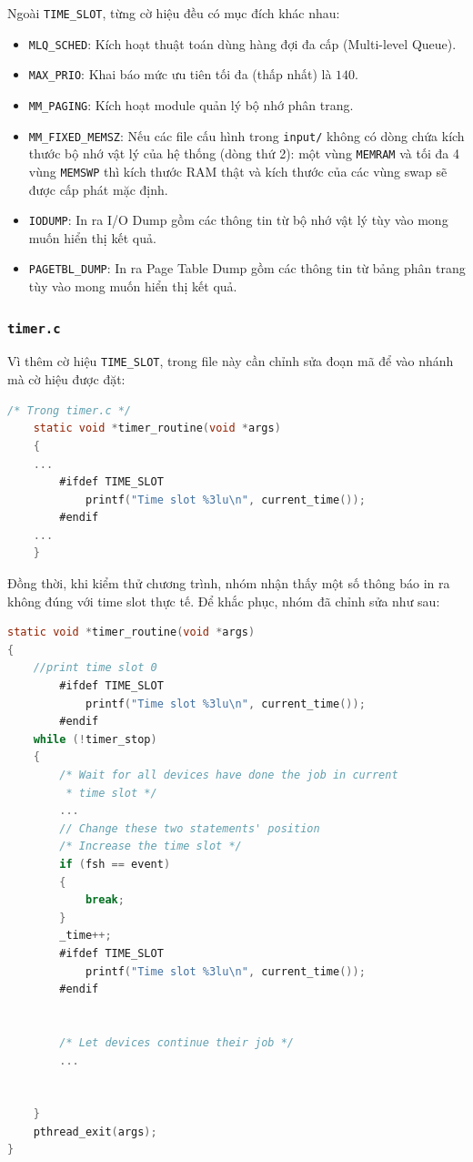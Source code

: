 Ngoài \texttt{TIME\_SLOT}, từng cờ hiệu đều có mục đích khác nhau:

\begin{itemize}
    \item \texttt{MLQ\_SCHED}: Kích hoạt thuật toán dùng hàng đợi đa cấp (Multi-level Queue).
    \item \texttt{MAX\_PRIO}: Khai báo mức ưu tiên tối đa (thấp nhất) là $140$.
    \item \texttt{MM\_PAGING}: Kích hoạt module quản lý bộ nhớ phân trang.
    \item \texttt{MM\_FIXED\_MEMSZ}: Nếu các file cấu hình trong \texttt{input/} không có dòng chứa kích thước bộ nhớ vật lý của hệ thống (dòng thứ 2): một vùng \texttt{MEMRAM} và tối đa 4 vùng \texttt{MEMSWP} thì kích thước RAM thật và kích thước của các vùng swap sẽ được cấp phát mặc định.
    \item \texttt{IODUMP}: In ra I/O Dump gồm các thông tin từ bộ nhớ vật lý tùy vào mong muốn hiển thị kết quả.
    \item \texttt{PAGETBL\_DUMP}: In ra Page Table Dump gồm các thông tin từ bảng phân trang tùy vào mong muốn hiển thị kết quả.
\end{itemize}

\subsubsection{\texttt{timer.c}}

Vì thêm cờ hiệu \texttt{TIME\_SLOT}, trong file này cần chỉnh sửa đoạn mã để vào nhánh mà cờ hiệu được đặt:

\begin{lstlisting}[style=Cstyle,language=C]
 /* Trong timer.c */
    static void *timer_routine(void *args)
    {
    ...
        #ifdef TIME_SLOT
        	printf("Time slot %3lu\n", current_time());
        #endif
    ...
    }
\end{lstlisting}

Đồng thời, khi kiểm thử chương trình, nhóm nhận thấy một số thông báo in ra không đúng với time slot thực tế. Để khắc phục, nhóm đã chỉnh sửa như sau:

\begin{lstlisting}[style=Cstyle,language=C]
static void *timer_routine(void *args)
{
	//print time slot 0
        #ifdef TIME_SLOT
			printf("Time slot %3lu\n", current_time());
		#endif
	while (!timer_stop)
	{
        /* Wait for all devices have done the job in current
		 * time slot */
		...
		// Change these two statements' position
		/* Increase the time slot */
		if (fsh == event)
		{
			break;
		}
		_time++;
		#ifdef TIME_SLOT
			printf("Time slot %3lu\n", current_time());
		#endif


		/* Let devices continue their job */
		...


	}
	pthread_exit(args);
}
\end{lstlisting}

